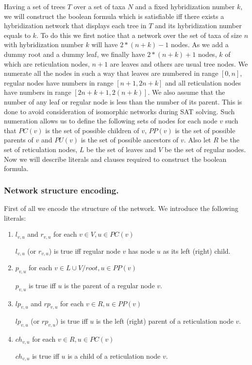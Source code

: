 \documentclass[runningheads, envcountsame, a4paper]{llncs}
\begin{document}
Having a set of trees $T$ over a set of taxa $N$ and a fixed hybridization number $k$, we will construct the boolean formula 
which is satisfiable iff there exists a hybridization network that displays each tree in $T$ and its hybridization 
number equals to $k$. To do this we first notice that a network over the set of taxa of size $n$ with hybridization number 
$k$ will have $2 * (n + k) - 1$ nodes. As we add a dummy root and a dummy leaf, we finally have $2 * (n + k) + 1$ nodes, 
$k$ of which are reticulation nodes, $n + 1$ are leaves and others are usual tree nodes. We numerate all the nodes in such a way 
that leaves are numbered in range $[0,n]$, regular nodes have numbers in range $[n + 1,2n + k]$ and all reticulation nodes have numbers 
in range $[2n + k + 1, 2(n + k)]$. We also assume that the number of any leaf or regular node is less than the number of its parent. This is done to 
avoid consideration of isomorphic networks during SAT solving. Such numeration allows us to define the following sets of nodes for each node 
$v$ such that $PC(v)$ is the set of possible children of $v$, $PP(v)$ is the set of possible parents of $v$ and $PU(v)$ is the set of possible ancestors of $v$. Also let $R$ be the set of reticulation nodes, $L$ be the set of leaves and $V$ be the set of regular nodes. 
Now we will describe literals and clauses required to construct the boolean formula.

\subsubsection{Network structure encoding.} 

First of all we encode the structure of the network. We introduce the following literals: 

\begin{enumerate}

\item $l_{v,u}$ and $r_{v,u}$ for each $v \in V, u \in PC(v)$ 

$l_{v,u}$ (or $r_{v,u}$) is true iff regular node $v$ has node $u$ as its left (right) child.

\item $p_{v,u}$  for each $v \in L \cup V / root, u \in PP(v)$

$p_{v,u}$ is true iff $u$ is the parent of a regular node $v$.

\item $lp_{v,u}$ and $rp_{v,u}$ for each $v \in R, u \in PP(v)$

$lp_{v,u}$ (or $rp_{v,u}$) is true iff $u$ is the left (right) parent of a reticulation node $v$.

\item $ch_{v,u}$ for each $v \in R, u \in PC(v)$

$ch_{v,u}$ is true iff $u$ is a child of a reticulation node $v$.

\end{enumerate}
\end{document}
